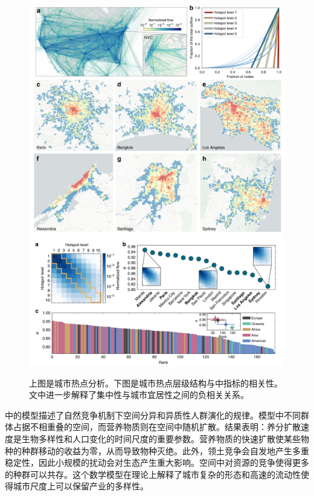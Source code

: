 \begin{figure}
  \centering
  \includegraphics[width = \linewidth]{pictures/h1.png}
  \includegraphics[width = \linewidth]{pictures/h2.png}
  \caption{上图是城市热点分析。下图是城市热点层级结构与\cite{hierarchicalorganization}中指标的相关性。文中进一步解释了集中性与城市宜居性之间的负相关关系。}
\end{figure}

\cite{Weiner17874}中的模型描述了自然竞争机制下空间分异和异质性人群演化的规律。模型中不同群体占据不相重叠的空间，而营养物质则在空间中随机扩散。结果表明：养分扩散速度是生物多样性和人口变化的时间尺度的重要参数。营养物质的快速扩散使某些物种的种群移动的收益为零，从而导致物种灭绝。此外，领土竞争会自发地产生多重稳定性，因此小规模的扰动会对生态产生重大影响。空间中对资源的竞争使得更多的种群可以共存。这个数学模型在理论上解释了城市复杂的形态和高速的流动性使得城市尺度上可以保留产业的多样性。

